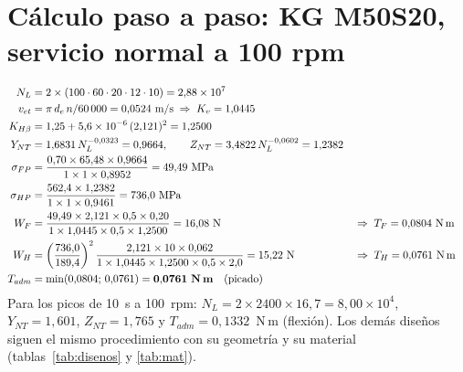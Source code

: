 \documentclass[11pt,a4paper]{article}
\begin{document}
\section{Cálculo paso a paso: KG M50S20, servicio normal a 100 rpm}
\begin{align*}
N_L &= 2\times(100\cdot60\cdot20\cdot12\cdot10) = 2{,}88\times10^{7}\\
v_{et} &= \pi\,d_e\,n/60\,000 = 0{,}0524\ \text{m/s} \;\Rightarrow\; K_v=1{,}0445\\
K_{H\beta} &= 1{,}25+5{,}6\times10^{-6}\,(2{,}121)^2=1{,}2500\\
Y_{NT} &= 1{,}6831\,N_L^{-0{,}0323}=0{,}9664,\qquad Z_{NT}=3{,}4822\,N_L^{-0{,}0602}=1{,}2382\\
\sigma_{FP} &= \frac{0{,}70\times65{,}48\times0{,}9664}{1\times1\times0{,}8952}=49{,}49\ \text{MPa}\\
\sigma_{HP} &= \frac{562{,}4\times1{,}2382}{1\times1\times0{,}9461}=736{,}0\ \text{MPa}\\
W_F &= \frac{49{,}49\times2{,}121\times0{,}5\times0{,}20}{1\times1{,}0445\times0{,}5\times1{,}2500}=16{,}08\ \text{N}
&&\Rightarrow\; T_F=0{,}0804\ \text{N\,m}\\
W_H &= \left(\frac{736{,}0}{189{,}4}\right)^2\frac{2{,}121\times10\times0{,}062}{1\times1{,}0445\times1{,}2500\times0{,}5\times2{,}0}=15{,}22\ \text{N}
&&\Rightarrow\; T_H=0{,}0761\ \text{N\,m}\\
T_{adm} &= \min(0{,}0804;\,0{,}0761)=\mathbf{0{,}0761\ \textbf{N\,m}}\quad\text{(picado)}
\end{align*}
Para los picos de 10~s a 100~rpm: $N_L=2\times2400\times16{,}7=8{,}00\times10^{4}$, $Y_{NT}=1{,}601$,
$Z_{NT}=1{,}765$ y $T_{adm}=0{,}1332$~N\,m (flexión). Los demás diseños siguen el mismo procedimiento con su
geometría y su material (tablas~\ref{tab:disenos} y \ref{tab:mat}).
\end{document}
